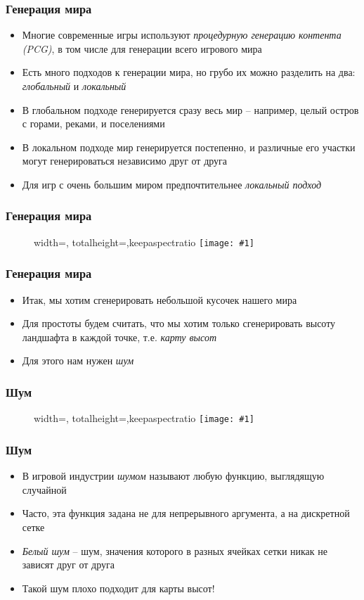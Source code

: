 \documentclass[10pt]{beamer}
\newcommand{\slideimage}[1]{
  \begin{figure}
    \begin{adjustbox}{width=\textwidth, totalheight=\textheight-2\baselineskip-2\baselineskip,keepaspectratio}
      \texttt{[image: \#1]}
    \end{adjustbox}
  \end{figure}
}
\begin{document}
\begin{frame}
\frametitle{Генерация мира}
\begin{itemize}
\item Многие современные игры используют \textit{процедурную генерацию контента (PCG)}, в том числе для генерации всего игрового мира
\pause
\item Есть много подходов к генерации мира, но грубо их можно разделить на два: \textit{глобальный} и \textit{локальный}
\pause
\item В глобальном подходе генерируется сразу весь мир -- например, целый остров с горами, реками, и поселениями
\pause
\item В локальном подходе мир генерируется постепенно, и различные его участки могут генерироваться независимо друг от друга
\pause
\item Для игр с очень большим миром предпочтительнее \textit{локальный подход}
\end{itemize}
\end{frame}

\begin{frame}
\frametitle{Генерация мира}
\slideimage{minecraft-chunk.png}
\end{frame}

\begin{frame}
\frametitle{Генерация мира}
\begin{itemize}
\item Итак, мы хотим сгенерировать небольшой кусочек нашего мира
\pause
\item Для простоты будем считать, что мы хотим только сгенерировать высоту ландшафта в каждой точке, т.е. \textit{карту высот}
\pause
\item Для этого нам нужен \textit{шум}
\end{itemize}
\end{frame}

\begin{frame}
\frametitle{Шум}
\slideimage{white-noise.png}
\end{frame}

\begin{frame}
\frametitle{Шум}
\begin{itemize}
\item В игровой индустрии \textit{шумом} называют любую функцию, выглядящую случайной
\pause
\item Часто, эта функция задана не для непрерывного аргумента, а на дискретной сетке
\pause
\item \textit{Белый шум} -- шум, значения которого в разных ячейках сетки никак не зависят друг от друга
\pause
\item Такой шум плохо подходит для карты высот!
\end{itemize}
\end{frame}
\end{document}
